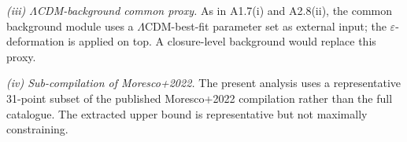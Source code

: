 \textit{(iii) $\Lambda$CDM-background common proxy.}
As in A1.7(i) and A2.8(ii), the common background module uses a
$\Lambda$CDM-best-fit parameter set as external input; the
$\varepsilon$-deformation is applied on top. A closure-level
background would replace this proxy.

\textit{(iv) Sub-compilation of Moresco+2022.}
The present analysis uses a representative 31-point subset of the
published Moresco+2022 compilation rather than the full catalogue.
The extracted upper bound is representative but not maximally
constraining.

